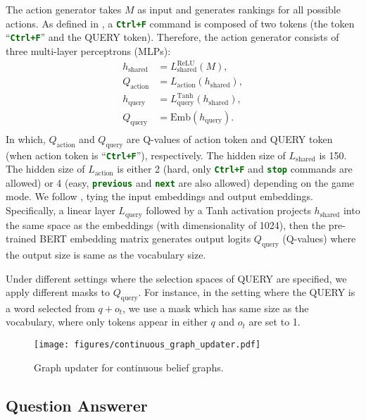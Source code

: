 \documentclass[11pt]{article}
\newcommand{\code}[1]{\texttt{#1}}
\newcommand{\cmd}[1]{\textcolor{darkgreen}{\textbf{\small{\code{#1}}}}}
\newcommand{\ctrlf}{Ctrl+F\xspace}
\newcommand{\query}{\textcolor{orange2}{\small{QUERY}}\xspace}
\begin{document}
The action generator takes $M$ as input and generates rankings for all possible actions. 
As defined in \citep{yuan2020imrc}, a \cmd{\ctrlf} command is composed of two tokens (the token ``\cmd{\ctrlf}'' and the \query token).
Therefore, the action generator consists of three multi-layer perceptrons (MLPs): 
\begin{equation}
\begin{aligned}
    h_{\text{shared}} &= L_{\text{shared}}^{\text{ReLU}}(M), \\
    Q_{\text{action}} &= L_{\text{action}}(h_{\text{shared}}), \\
    h_{\text{query}} &= L^{\text{Tanh}}_{\text{query}}(h_{\text{shared}}),\\
    Q_{\text{query}} &= \textrm{Emb}(h_{\text{query}}). \\
\end{aligned}
\end{equation}
In which, $Q_{\text{action}}$ and $Q_{\text{query}}$ are Q-values of action token and \query token (when action token is ``\cmd{\ctrlf}''), respectively. 
The hidden size of $L_{\text{shared}}$ is 150.
The hidden size of $L_{\text{action}}$ is either 2 (hard, only \cmd{\ctrlf } and \cmd{stop} commands are allowed) or 4 (easy, \cmd{previous} and \cmd{next} are also allowed) depending on the game mode.
We follow \citep{press2016using}, tying the input embeddings and output embeddings.
Specifically, a linear layer $L_{\text{query}}$ followed by a Tanh activation projects $h_{\text{shared}}$ into the same space as the embeddings (with dimensionality of 1024), then the pre-trained BERT embedding matrix generates output logits $Q_{\text{query}}$ (Q-values) where the output size is same as the vocabulary size.

Under different settings where the selection spaces of \query are specified, we apply different masks to $Q_{\text{query}}$. 
For instance, in the setting where the \query is a word selected from $q + o_t$, we use a mask which has same size as the vocabulary, where only tokens appear in either $q$ and $o_t$ are set to 1.

\begin{figure*}[t!]
    \centering
    \texttt{[image: figures/continuous\_graph\_updater.pdf]}
    \caption{Graph updater for continuous belief graphs. }
    \label{fig:continuous_graph_updater}
\end{figure*}


\subsection{Question Answerer}
\end{document}
